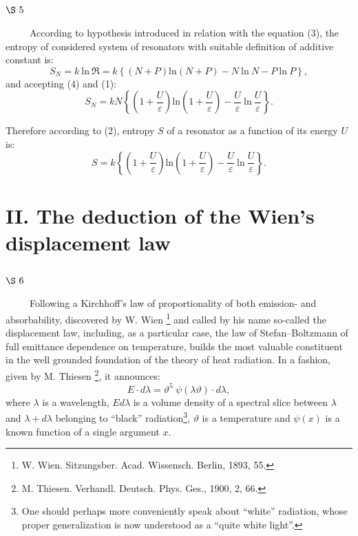 \documentclass{article}
\begin{document}
\vspace{0.5cm}
\subsection*{
{\bf $\S~5$}}
\vspace{0.3cm}

~~~~~According to hypothesis introduced in relation with the equation (3), 
the entropy of considered system of resonators with suitable definition 
of additive constant is:
\begin{equation}
S_N = k~ \mbox{ln}~ \Re = k \left\{ \left( N + P \right) \mbox{ln} \left(N + P 
\right) - N~ \mbox{ln}~ N - P ~ \mbox{ln} ~ P \right\},
\end{equation}
and accepting (4) and (1):
$$
S_N = kN \left\{ \left( 1 + \frac{U}{\varepsilon} \right) \mbox{ln} \left( 1 + 
\frac{U}{\varepsilon} \right) - \frac{U}{\varepsilon} ~ \mbox{ln} ~
\frac{U}{\varepsilon} \right\}.
$$

Therefore according to (2), entropy $S$ of a resonator as a function 
of its energy $U$ is: 
\begin{equation}
S = k \left\{ \left( 1 + \frac{U}{\varepsilon} \right) \mbox{ln} 
\left( 1 + \frac{
U}{\varepsilon} \right) - \frac{U}{\varepsilon}~ \mbox{ln} ~\frac{U}
{\varepsilon} \right\}.
\end{equation}

\vspace{0.5cm}
\section*{
{\bf II. The deduction of the Wien's displacement law}}

\vspace{0.5cm}
\subsection*{
{\bf $\S~6$}}
\vspace{0.3cm}

~~~~~Following a Kirchhoff's law of proportionality of both emission- and 
absorbability, discovered by W. Wien
\footnote{W. Wien. Sitzungsber. Acad. Wissensch.
Berlin, 1893, 55.} and called by his name so-called the displacement law,
including, as a particular case, the law of Stefan--Boltzmann 
of full emittance dependence on temperature, 
builds the most valuable constituent 
in the well grounded foundation of the theory of heat radiation.
In a fashion, given by M. Thiesen
\footnote{M. Thiesen. Verhandl. Deutsch. Phys. Ges.,
1900, 2, 66.}, it announces:
$$
E \cdot d \lambda = \vartheta^5 ~ \psi (\lambda \vartheta) \cdot d \lambda,
$$
where $\lambda$ is a wavelength, $Ed \lambda$ is a volume density 
of a spectral slice between $\lambda$ and $\lambda + d \lambda$ 
belonging to ``black'' radiation\footnote{One should perhaps more conveniently 
speak about ``white'' radiation, whose proper generalization 
is now understood as a ``quite white light''.}, 
$\vartheta$ is a temperature and $\psi(x)$ is a known function 
of a single argument $x$. 
\end{document}
